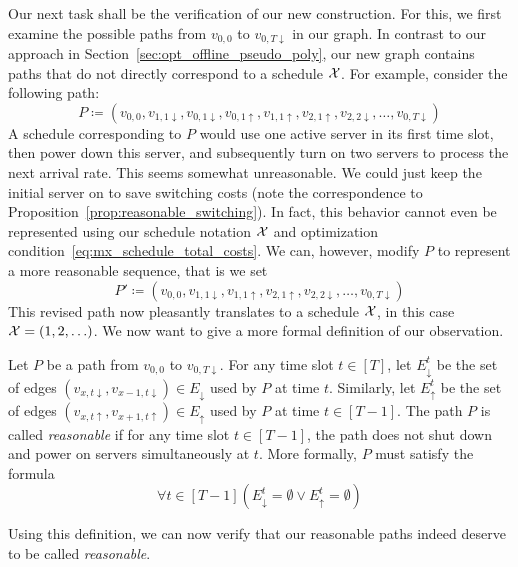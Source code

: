 Our next task shall be the verification of our new construction. For this, we first examine the possible paths from $v_{0,0}$ to $v_{0,T\downarrow}$ in our graph.
In contrast to our approach in Section~\ref{sec:opt_offline_pseudo_poly}, our new graph contains paths that do not directly correspond to a schedule $\mathcal{X}$. For example, consider the following path:
\begin{equation*}
	P\coloneqq(v_{0,0},v_{1,1\downarrow},v_{0,1\downarrow},v_{0,1\uparrow},v_{1,1\uparrow},v_{2,1\uparrow},v_{2,2\downarrow},\ldots,v_{0,T\downarrow})
\end{equation*}
A schedule corresponding to $P$ would use one active server in its first time slot, then power down this server, and subsequently turn on two servers to process the next arrival rate. This seems somewhat unreasonable. We could just keep the initial server on to save switching costs (note the correspondence to Proposition~\ref{prop:reasonable_switching}). In fact, this behavior cannot even be represented using our schedule notation $\mathcal{X}$ and optimization condition~\eqref{eq:mx_schedule_total_costs}. We can, however, modify $P$ to represent a more reasonable sequence, that is we set
\begin{equation*}
	P'\coloneqq(v_{0,0},v_{1,1\downarrow},v_{1,1\uparrow},v_{2,1\uparrow},v_{2,2\downarrow},\ldots,v_{0,T\downarrow})
\end{equation*}
This revised path now pleasantly translates to a schedule $\mathcal{X}$, in this case $\mathcal{X}=(1,2,\ldots)$. We now want to give a more formal definition of our observation.
\begin{defn}\label{defn_reasn_paths}
Let $P$ be a path from $v_{0,0}$ to $v_{0,T\downarrow}$. For any time slot $t\in[T]$, let $E_\downarrow^t$ be the set of edges $(v_{x,t\downarrow},v_{x-1,t\downarrow})\in E_\downarrow$ used by $P$ at time $t$. Similarly, let $E_\uparrow^t$ be the set of edges $(v_{x,t\uparrow},v_{x+1,t\uparrow})\in E_\uparrow$ used by $P$ at time $t\in[T-1]$.
The path $P$ is called \textit{reasonable} if for any time slot $t\in[T-1]$, the path does not shut down and power on servers simultaneously at $t$. More formally, $P$ must satisfy the formula
\begin{equation}
	\forall t\in[T-1]\left(E_\downarrow^t=\emptyset \lor E_\uparrow^t=\emptyset\right)\label{eq:reasn_path}
\end{equation}
\end{defn}
Using this definition, we can now verify that our reasonable paths indeed deserve to be called \textit{reasonable}.
